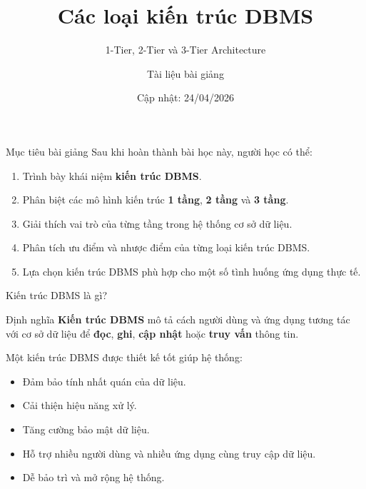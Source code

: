 \documentclass[aspectratio=169,11pt]{beamer}
\title[Các loại kiến trúc DBMS]{Các loại kiến trúc DBMS}
\subtitle{1-Tier, 2-Tier và 3-Tier Architecture}
\author{Tài liệu bài giảng}
\institute{Môn học: Cơ sở dữ liệu}
\date{Cập nhật: 24/04/2026}
\newcommand{\keyword}[1]{\textcolor{accent}{\textbf{#1}}}
\newcommand{\tightlist}{\setlength{\itemsep}{2pt}\setlength{\parskip}{0pt}}
\begin{document}
\begin{frame}
  \titlepage
\end{frame}

\begin{frame}{Mục tiêu bài giảng}
\small
Sau khi hoàn thành bài học này, người học có thể:
\begin{enumerate}
\tightlist
  \item Trình bày khái niệm \keyword{kiến trúc DBMS}.
  \item Phân biệt các mô hình kiến trúc \keyword{1 tầng}, \keyword{2 tầng} và \keyword{3 tầng}.
  \item Giải thích vai trò của từng tầng trong hệ thống cơ sở dữ liệu.
  \item Phân tích ưu điểm và nhược điểm của từng loại kiến trúc DBMS.
  \item Lựa chọn kiến trúc DBMS phù hợp cho một số tình huống ứng dụng thực tế.
\end{enumerate}
\end{frame}

\begin{frame}{Kiến trúc DBMS là gì?}
\small
\begin{block}{Định nghĩa}
\keyword{Kiến trúc DBMS} mô tả cách người dùng và ứng dụng tương tác với cơ sở dữ liệu để \textbf{đọc}, \textbf{ghi}, \textbf{cập nhật} hoặc \textbf{truy vấn} thông tin.
\end{block}

Một kiến trúc DBMS được thiết kế tốt giúp hệ thống:
\begin{itemize}
\tightlist
  \item Đảm bảo tính nhất quán của dữ liệu.
  \item Cải thiện hiệu năng xử lý.
  \item Tăng cường bảo mật dữ liệu.
  \item Hỗ trợ nhiều người dùng và nhiều ứng dụng cùng truy cập dữ liệu.
  \item Dễ bảo trì và mở rộng hệ thống.
\end{itemize}
\end{frame}
\end{document}
